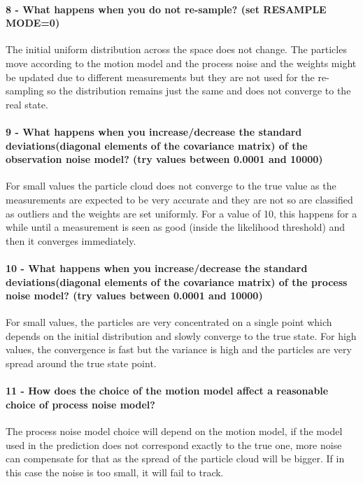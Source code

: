 \documentclass[12pt]{article}
\begin{document}
\paragraph{8 - What happens when you do not re-sample? (set RESAMPLE MODE=0)} The initial uniform distribution across the space does not change. The particles move according to the motion model and the process noise and the weights might be updated due to different measurements but they are not used for the re-sampling so the distribution remains just the same and does not converge to the real state.

\paragraph{9 - What happens when you increase/decrease the standard deviations(diagonal elements of the covariance matrix) of the observation noise model? (try values between 0.0001 and 10000)}
For small values the particle cloud does not converge to the true value as the measurements are expected to be very accurate and they are not so are classified as outliers and the weights are set uniformly. For a value of 10, this happens for a while until a measurement is seen as good (inside the likelihood threshold) and then it converges immediately.

\paragraph{10 - What happens when you increase/decrease the standard deviations(diagonal elements of the covariance matrix) of the process noise model? (try values between 0.0001 and 10000)}
For small values, the particles are very concentrated on a single point which depends on the initial distribution and slowly converge to the true state. For high values, the convergence is fast but the variance is high and the particles are very spread around the true state point.

\paragraph{11 - How does the choice of the motion model affect a reasonable choice of process noise model?}
The process noise model choice will depend on the motion model, if the model used in the prediction does not correspond exactly to the true one, more noise can compensate for that as the spread of the particle cloud will be bigger. If in this case the noise is too small, it will fail to track.
\end{document}
